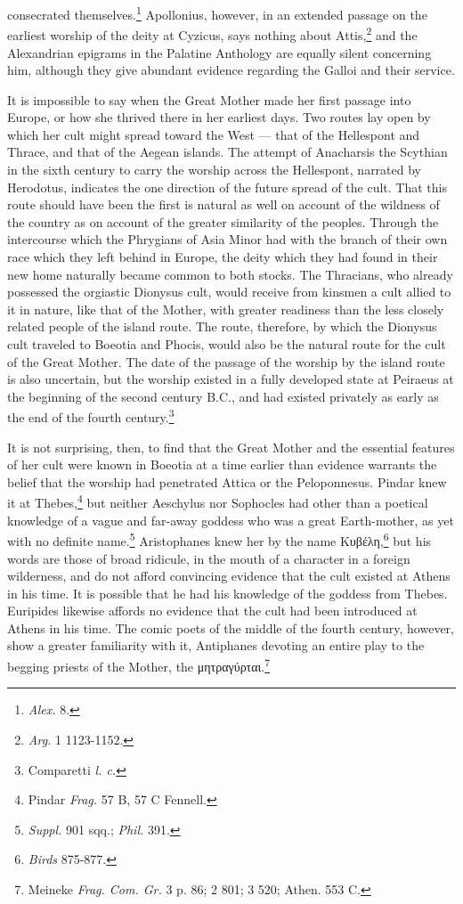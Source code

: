 \documentclass[a4paper, 11pt, oneside, polutonikogreek, english]{article}
\begin{document}
consecrated themselves.\footnote{\emph{Alex.} 8.} Apollonius, however, in an extended passage on the earliest worship of the deity at Cyzicus, says nothing about Attis,\footnote{\emph{Arg.} 1 1123-1152.} and the Alexandrian epigrams in the Palatine Anthology are equally silent concerning him, although they give abundant evidence regarding the Galloi and their service.

It is impossible to say when the Great Mother made her first passage into Europe, or how she thrived there in her earliest days. Two routes lay open by which her cult might spread toward the West --- that of the Hellespont and Thrace, and that of the Aegean islands. The attempt of Anacharsis the Scythian in the sixth century to carry the worship across the Hellespont, narrated by Herodotus, indicates the one direction of the future spread of the cult. That this route should have been the first is natural as well on account of the wildness of the country as on account of the greater similarity of the peoples. Through the intercourse which the Phrygians of Asia Minor had with the branch of their own race which they left behind in Europe, the deity which they had found in their new home naturally became common to both stocks. The Thracians, who already possessed the orgiastic Dionysus cult, would receive from kinsmen a cult allied to it in nature, like that of the Mother, with greater readiness than the less closely related people of the island route. The route, therefore, by which the Dionysus cult traveled to Boeotia and Phocis, would also be the natural route for the cult of the Great Mother. The date of the passage of the worship by the island route is also uncertain, but the worship existed in a fully developed state at Peiraeus at the beginning of the second century \textsc{B.C.}, and had existed privately as early as the end of the fourth century.\footnote{Comparetti \emph{l. c.}}

It is not surprising, then, to find that the Great Mother and the essential features of her cult were known in Boeotia at a time earlier than evidence warrants the belief that the worship had penetrated Attica or the Peloponnesus. Pindar knew it at Thebes,\footnote{Pindar \emph{Frag.} 57 B, 57 C Fennell.} but neither Aeschylus nor Sophocles had other than a poetical knowledge of a vague and far-away goddess who was a great Earth-mother, as yet with no definite name.\footnote{\emph{Suppl.} 901 sqq.; \emph{Phil.} 391.} Aristophanes knew her by the name Κυβέλη,\footnote{\emph{Birds} 875-877.} but his words are those of broad ridicule, in the mouth of a character in a foreign wilderness, and do not afford convincing evidence that the cult existed at Athens in his time. It is possible that he had his knowledge of the goddess from Thebes. Euripides likewise affords no evidence that the cult had been introduced at Athens in his time. The comic poets of the middle of the fourth century, however, show a greater familiarity with it, Antiphanes devoting an entire play to the begging priests of the Mother, the μητραγύρται.\footnote{Meineke \emph{Frag. Com. Gr.} 3 p. 86; 2 801; 3 520; Athen. 553 C.}
\end{document}
